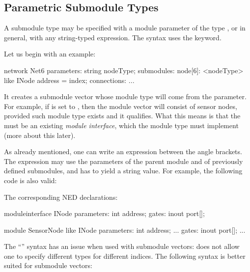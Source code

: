 \subsection{Parametric Submodule Types}
\label{sec:ned-lang:submodule-like}

A submodule type may be specified with a module parameter of the type
, or in general, with any string-typed expression.
The syntax uses the  keyword.

Let us begin with an example:

\begin{ned}
network Net6
{
    parameters:
        string nodeType;
    submodules:
        node[6]: <nodeType> like INode {
            address = index;
        }
    connections:
        ...
}
\end{ned}

It creates a submodule vector whose module type will come from the
 parameter. For example, if  is set to ,
then the module vector will consist of sensor nodes, provided such module
type exists and it qualifies. What this means is that the  must be
an existing \textit{module interface}, which the 
module type must implement (more about this later).

As already mentioned, one can write an expression between the angle
brackets. The expression may use the parameters of the parent module and of
previously defined submodules, and has to yield a string value. For
example, the following code is also valid:

\begin{ned}
network Net6
{
    parameters:
        string nodeTypePrefix;
        int variant;
    submodules:
        node[6]: <nodeTypePrefix + "Node" + string(variant)> like INode {
           ...
}
\end{ned}

The corresponding NED declarations:

\begin{ned}
moduleinterface INode
{
    parameters:
        int address;
    gates:
        inout port[];
}

module SensorNode like INode
{
    parameters:
        int address;
        ...
    gates:
        inout port[];
        ...
}
\end{ned}

The ``'' syntax has an issue when used
with submodule vectors: does not allow one to specify different types
for different indices. The following syntax is better suited for
submodule vectors:

